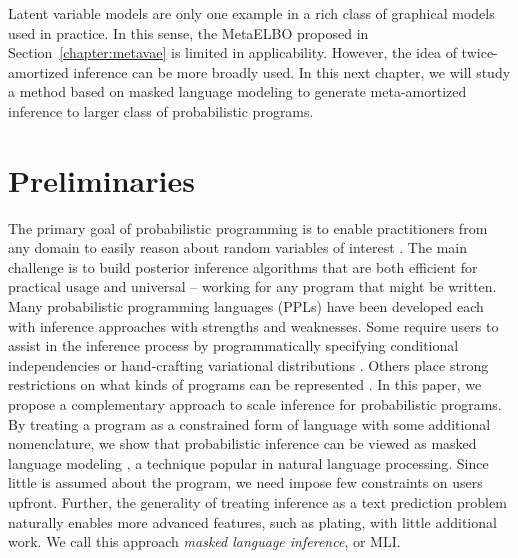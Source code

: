 Latent variable models are only one example in a rich class of graphical models used in practice. In this sense, the MetaELBO proposed in Section~\ref{chapter:metavae} is limited in applicability. However, the idea of twice-amortized inference can be more broadly used. In this next chapter, we will study a method based on masked language modeling to generate meta-amortized inference to larger class of probabilistic programs. 

\section{Preliminaries}

The primary goal of probabilistic programming is to enable practitioners from any domain to easily reason about random variables of interest \cite{gordon2014probabilistic,van2018introduction}.
The main challenge is to build posterior inference algorithms that are both efficient for practical usage and universal -- working for any program that might be written. Many probabilistic programming languages (PPLs) have been developed \cite{goodman2012church,minka2012infer,dippl,mansinghka2014venture,depaoli2016just,tolpin2016design,narayanan2016probabilistic,salvatier2016probabilistic,tran2016edward,carpenter2017stan,ge2018turing,cusumano2019gen,bingham2019pyro,tehrani2020bean} each with inference approaches with strengths and weaknesses. Some require users to assist in the inference process by programmatically specifying conditional independencies \cite{bingham2019pyro} or hand-crafting variational distributions \cite{ritchie2015controlling,bingham2019pyro,cusumano2019gen}. Others place strong restrictions on what kinds of programs can be represented \cite{carpenter2017stan}.
In this paper, we propose a complementary approach to scale inference for probabilistic programs. By treating a program as a constrained form of language with some additional nomenclature, we show that probabilistic inference can be viewed as masked language modeling \cite{vaswani2017attention,devlin2018bert}, a technique popular in natural language processing. Since little is assumed about the program, we need impose few constraints on users upfront. Further, the generality of treating inference as a text prediction problem naturally enables more advanced features, such as plating, with little additional work. We call this approach \textit{masked language inference}, or MLI.

